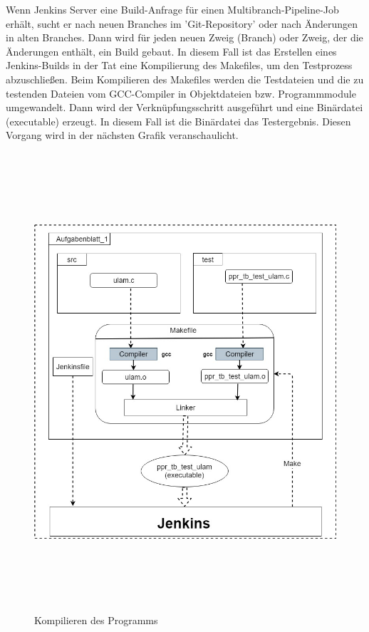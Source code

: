 \documentclass[a4paper,12pt,oneside]{book}
\begin{document}
Wenn Jenkins Server eine Build-Anfrage für einen Multibranch-Pipeline-Job erhält, sucht er nach neuen Branches im 'Git-Repository' oder nach Änderungen in alten Branches. Dann wird für jeden neuen Zweig (Branch) oder Zweig, der die Änderungen enthält, ein Build gebaut.
\newline
In diesem Fall ist das Erstellen eines Jenkins-Builds in der Tat eine Kompilierung des Makefiles, um den Testprozess abzuschließen.
\newline
Beim Kompilieren des Makefiles werden die Testdateien und die zu testenden Dateien vom GCC-Compiler in Objektdateien bzw. Programmmodule umgewandelt. Dann wird der Verknüpfungsschritt ausgeführt und eine Binärdatei (executable) erzeugt. In diesem Fall ist die Binärdatei das Testergebnis. Diesen Vorgang wird in der nächsten Grafik veranschaulicht.
\newpage
\begin{figure}[h!]
	\begin{center}
		\includegraphics[width=15cm, height=17cm]{Makefile.jpg}
		\caption{Kompilieren des Programms} 
		\label{Kompilieren des Programms} 
	\end{center}
\end{figure}
\end{document}
